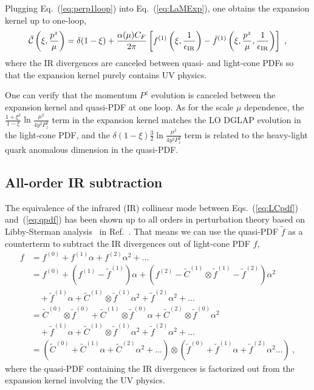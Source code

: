 \documentclass[a4paper,11pt]{article}
\begin{document}
Plugging Eq.~(\ref{eq:perp1loop}) into Eq.~(\ref{eq:LaMExp}), one obtains the expansion kernel up to one-loop,
\begin{align}\label{eq:expC1loop}
    \tilde {\cal C} \left( \xi, \frac{p^z}{\mu} \right)
    = \delta(1-\xi) + \frac{\alpha(\mu) C_F}{2 \pi} \left[ f^{(1)}\left(\xi, \frac{1}{\epsilon_{\rm IR}}\right) - \tilde f^{(1)}\left(\xi,\frac{p^z}{\mu},\frac{1}{\epsilon_{\rm IR}}\right) \right] \ ,
\end{align}
where the IR divergences are canceled between quasi- and light-cone PDFs so that the expansion kernel purely contains UV physics.

One can verify that the momentum $P^z$ evolution is canceled between the expansion kernel and quasi-PDF at one loop. As for the scale $\mu$ dependence, the $\frac{1+\xi^2}{1-\xi}\ln \frac{\mu^2}{4 y^2 P_z^2}$ term in the expansion kernel matches the LO DGLAP evolution in the light-cone PDF, and the $\delta(1-\xi)\frac{3}{2} \ln \frac{\mu^2}{4 y^2 P_z^2}$ term is related to the heavy-light quark anomalous dimension in the quasi-PDF. 

\subsection{All-order IR subtraction}\label{sec:justLaMET2}
The equivalence of the infrared (IR) collinear mode between Eqs.~(\ref{eq:LCpdf}) and~(\ref{eq:qpdf}) has been shown up to all orders in perturbation theory based on Libby-Sterman analysis~\cite{Curci:1980uw,Collins:2011zzd} in Ref.~\cite{Ji:2020ect}. 
That means we can use the quasi-PDF $\tilde f$ as a counterterm to subtract the IR divergences out of light-cone PDF $f$,
\begin{align}
    f &= f^{(0)} + f^{(1)} \alpha + f^{(2)} \alpha^2 + ... \nonumber\\
    &= f^{(0)} + \left( f^{(1)} - \tilde f^{(1)} \right) \alpha  + \left( f^{(2)}  - \tilde C^{(1)} \otimes \tilde f^{(1)} - \tilde f^{(2)} \right) \alpha^2 \nonumber\\
    & \quad + \tilde f^{(1)} \alpha + \tilde C^{(1)} \otimes \tilde f^{(1)} \alpha^2 + \tilde f^{(2)} \alpha^2 + ... \nonumber\\
    &= \tilde C^{(0)} \otimes \tilde f^{(0)} + \tilde C^{(1)} \otimes \tilde f^{(0)} \alpha + \tilde C^{(2)} \otimes \tilde f^{(0)}  \alpha^2 \nonumber\\
    & \quad + \tilde f^{(1)} \alpha + \tilde C^{(1)} \otimes \tilde f^{(1)} \alpha^2 + \tilde f^{(2)} \alpha^2 + ... \nonumber\\
    &= (\tilde C^{(0)} + \tilde C^{(1)} \alpha + \tilde C^{(2)} \alpha^2 + ...) \otimes (\tilde f^{(0)} + \tilde f^{(1)} \alpha + \tilde f^{(2)} \alpha^2 ...) \ ,
\end{align}
where the quasi-PDF containing the IR divergences is factorized out from the expansion kernel involving the UV physics. 
\end{document}
